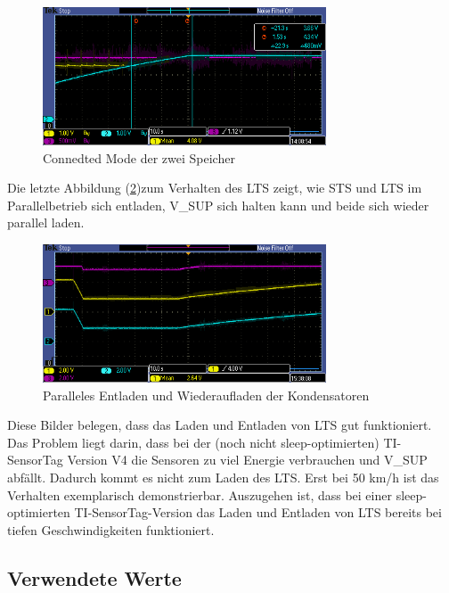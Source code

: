 \begin{figure}[ht]
   \includegraphics[width=0.75\textwidth]{4Resultate/imag/STS_LTS_connect.PNG}
    \caption{Connedted Mode der zwei Speicher}
    \label{connected_mode}
\end{figure}

Die letzte Abbildung (\ref{parallel_entladen})zum Verhalten des LTS zeigt, wie STS und LTS im Parallelbetrieb sich entladen, V\_SUP sich halten kann und beide sich wieder parallel laden. 

\begin{figure}[ht]
   \includegraphics[width=0.75\textwidth]{4Resultate/imag/pic1.PNG}
    \caption{Paralleles Entladen und Wiederaufladen der Kondensatoren}
    \label{parallel_entladen}
\end{figure}

Diese Bilder belegen, dass das Laden und Entladen von LTS gut funktioniert. Das Problem liegt darin, dass bei der (noch nicht sleep-optimierten) TI-SensorTag Version V4 die Sensoren zu viel Energie verbrauchen und V\_SUP abfällt. Dadurch kommt es nicht zum Laden des LTS. Erst bei 50 km/h ist das Verhalten exemplarisch demonstrierbar. Auszugehen ist, dass bei einer sleep-optimierten TI-SensorTag-Version das Laden und Entladen von LTS bereits bei tiefen Geschwindigkeiten funktioniert.

\subsection{Verwendete Werte}
\label{werte}

